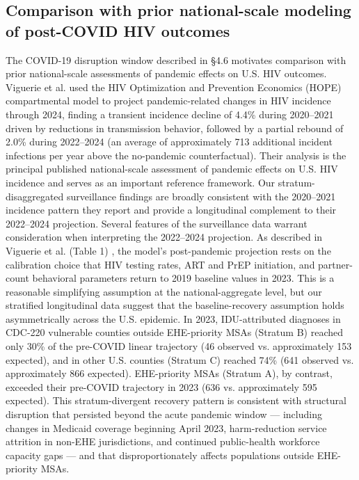 \documentclass[11pt]{article}
\begin{document}
\subsection{Comparison with prior national-scale modeling of post-COVID HIV outcomes}

The COVID-19 disruption window described in §4.6 motivates comparison with prior national-scale assessments of pandemic effects on U.S. HIV outcomes. Viguerie et al. \cite{viguerie2024} used the HIV Optimization and Prevention Economics (HOPE) compartmental model to project pandemic-related changes in HIV incidence through 2024, finding a transient incidence decline of 4.4\% during 2020–2021 driven by reductions in transmission behavior, followed by a partial rebound of 2.0\% during 2022–2024 (an average of approximately 713 additional incident infections per year above the no-pandemic counterfactual). Their analysis is the principal published national-scale assessment of pandemic effects on U.S. HIV incidence and serves as an important reference framework. Our stratum-disaggregated surveillance findings are broadly consistent with the 2020–2021 incidence pattern they report and provide a longitudinal complement to their 2022–2024 projection.
Several features of the surveillance data warrant consideration when interpreting the 2022–2024 projection. As described in Viguerie et al. (Table 1) \cite{viguerie2024}, the model's post-pandemic projection rests on the calibration choice that HIV testing rates, ART and PrEP initiation, and partner-count behavioral parameters return to 2019 baseline values in 2023. This is a reasonable simplifying assumption at the national-aggregate level, but our stratified longitudinal data suggest that the baseline-recovery assumption holds asymmetrically across the U.S. epidemic. In 2023, IDU-attributed diagnoses in CDC-220 vulnerable counties outside EHE-priority MSAs (Stratum B) reached only 30\% of the pre-COVID linear trajectory (46 observed vs. approximately 153 expected), and in other U.S. counties (Stratum C) reached 74\% (641 observed vs. approximately 866 expected). EHE-priority MSAs (Stratum A), by contrast, exceeded their pre-COVID trajectory in 2023 (636 vs. approximately 595 expected). This stratum-divergent recovery pattern is consistent with structural disruption that persisted beyond the acute pandemic window — including changes in Medicaid coverage beginning April 2023, harm-reduction service attrition in non-EHE jurisdictions, and continued public-health workforce capacity gaps — and that disproportionately affects populations outside EHE-priority MSAs.
\end{document}
